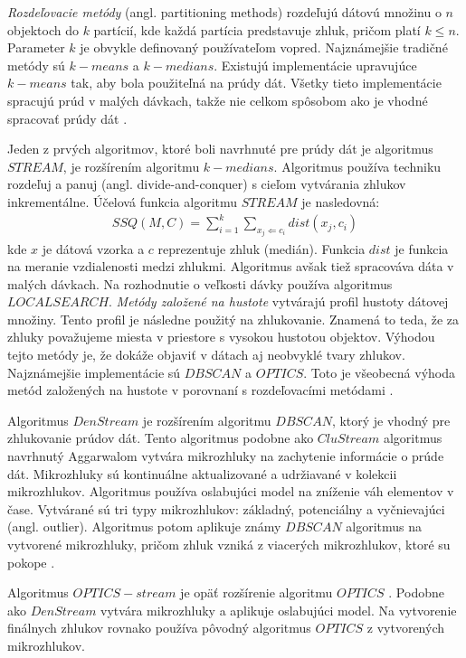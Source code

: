 \textit{Rozdeľovacie metódy} (angl. partitioning methods) rozdeľujú dátovú množinu o $n$ objektoch do $k$ partícií, kde každá partícia predstavuje zhluk, pričom platí $k\leq n$. Parameter $k$ je obvykle definovaný používateľom vopred. Najznámejšie tradičné metódy sú $k-means$ a $k-medians$. Existujú implementácie upravujúce $k-means$ tak, aby bola použiteľná na prúdy dát. Všetky tieto implementácie spracujú prúd v malých dávkach, takže nie celkom spôsobom ako je vhodné spracovať prúdy dát \citep{gaber2005mining}.
\par
Jeden z prvých algoritmov, ktoré boli navrhnuté pre prúdy dát je algoritmus $STREAM$, je rozšírením algoritmu $k-medians$. Algoritmus používa techniku rozdeľuj a panuj (angl. divide-and-conquer) s cieľom vytvárania zhlukov inkrementálne. Účelová funkcia algoritmu $STREAM$ je nasledovná:
\begin{align*}
SSQ(M,C) = \sum_{i=1}^{k} \sum_{x_j\Leftarrow c_i} dist(x_j, c_i)
\end{align*}
kde $x$ je dátová vzorka a $c$ reprezentuje zhluk (medián). Funkcia $dist$ je funkcia na meranie vzdialenosti medzi zhlukmi. Algoritmus avšak tiež spracováva dáta v malých dávkach. Na rozhodnutie o veľkosti dávky používa algoritmus $LOCALSEARCH$.
\textit{Metódy založené na hustote} vytvárajú profil hustoty dátovej množiny. Tento profil je následne použitý na zhlukovanie. Znamená to teda, že za zhluky považujeme miesta v priestore s vysokou hustotou objektov. Výhodou tejto metódy je, že dokáže objaviť v dátach aj neobvyklé tvary zhlukov. Najznámejšie implementácie sú $DBSCAN$ a $OPTICS$. Toto je všeobecná výhoda metód založených na hustote v porovnaní s rozdeľovacími metódami \citep{han2011data}.
\par
Algoritmus $DenStream$ je rozšírením algoritmu $DBSCAN$, ktorý je vhodný pre zhlukovanie prúdov dát. Tento algoritmus podobne ako $CluStream$ algoritmus navrhnutý Aggarwalom \citep{aggarwal2003framework} vytvára mikrozhluky na zachytenie informácie o prúde dát. Mikrozhluky sú kontinuálne aktualizované a udržiavané v kolekcii mikrozhlukov. Algoritmus používa oslabujúci model na zníženie váh elementov v čase. Vytvárané sú tri typy mikrozhlukov: základný, potenciálny a vyčnievajúci (angl. outlier). Algoritmus potom aplikuje známy $DBSCAN$ algoritmus na vytvorené mikrozhluky, pričom zhluk vzniká z viacerých mikrozhlukov, ktoré su pokope \citep{nguyen2015survey}.
\par
Algoritmus $OPTICS-stream$ je opäť rozšírenie algoritmu $OPTICS$ \citep{ankerst1999optics}. Podobne ako $DenStream$ vytvára mikrozhluky a aplikuje oslabujúci model. Na vytvorenie finálnych zhlukov rovnako používa pôvodný algoritmus $OPTICS$ z vytvorených mikrozhlukov.

